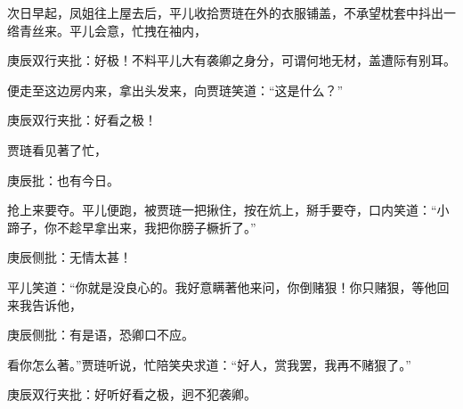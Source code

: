 \begin{parag}
    次日早起，凤姐往上屋去后，平儿收拾贾琏在外的衣服铺盖，不承望枕套中抖出一绺青丝来。平儿会意，忙拽在袖内，\begin{note}庚辰双行夹批：好极！不料平儿大有袭卿之身分，可谓何地无材，盖遭际有别耳。\end{note}便走至这边房内来，拿出头发来，向贾琏笑道：“这是什么？”\begin{note}庚辰双行夹批：好看之极！\end{note}贾琏看见著了忙，\begin{note}庚辰批：也有今日。\end{note}抢上来要夺。平儿便跑，被贾琏一把揪住，按在炕上，掰手要夺，口内笑道：“小蹄子，你不趁早拿出来，我把你膀子橛折了。”\begin{note}庚辰侧批：无情太甚！\end{note}平儿笑道：“你就是没良心的。我好意瞒著他来问，你倒赌狠！你只赌狠，等他回来我告诉他，\begin{note}庚辰侧批：有是语，恐卿口不应。\end{note}看你怎么著。”贾琏听说，忙陪笑央求道：“好人，赏我罢，我再不赌狠了。”\begin{note}庚辰双行夹批：好听好看之极，迥不犯袭卿。\end{note}
\end{parag}


